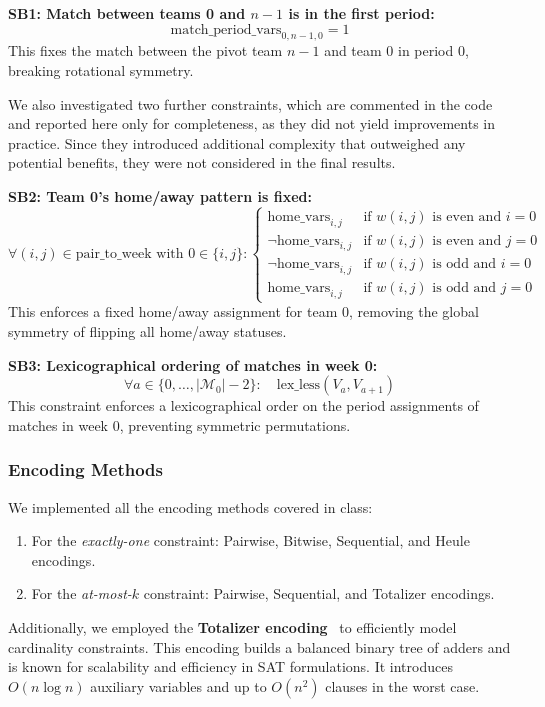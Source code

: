 \textbf{SB1: Match between teams 0 and $n-1$ is in the first period:}
\[
\text{match\_period\_vars}_{0,n-1,0} = 1
\]
This fixes the match between the pivot team $n-1$ and team 0 in period 0, breaking rotational symmetry.

We also investigated two further constraints, which are commented in the code and reported here only for completeness, as they did not yield improvements in practice. Since they introduced additional complexity that outweighed any potential benefits, they were not considered in the final results.

\textbf{SB2: Team 0's home/away pattern is fixed:}
\[
\forall (i,j) \in \text{pair\_to\_week} \text{ with } 0 \in \{i,j\}:
\begin{cases}
\text{home\_vars}_{i,j} & \text{if } w(i,j) \text{ is even and } i=0 \\
\neg \text{home\_vars}_{i,j} & \text{if } w(i,j) \text{ is even and } j=0 \\
\neg \text{home\_vars}_{i,j} & \text{if } w(i,j) \text{ is odd and } i=0 \\
\text{home\_vars}_{i,j} & \text{if } w(i,j) \text{ is odd and } j=0
\end{cases}
\]
This enforces a fixed home/away assignment for team 0, removing the global symmetry of flipping all home/away statuses.

\textbf{SB3: Lexicographical ordering of matches in week 0:}
\[
\forall a \in \{0, \dots, |\mathcal{M}_0| - 2\}: \quad \text{lex\_less}(V_a, V_{a+1})
\]
This constraint enforces a lexicographical order on the period assignments of matches in week 0, preventing symmetric permutations.


\subsubsection*{Encoding Methods}
We implemented all the encoding methods covered in class:

\begin{enumerate}
    \item For the \textit{exactly-one} constraint: Pairwise, Bitwise, Sequential, and Heule encodings.
    \item For the \textit{at-most-$k$} constraint: Pairwise, Sequential, and Totalizer encodings.
\end{enumerate}

Additionally, we employed the \textbf{Totalizer encoding}~\cite{bailleux2003} to efficiently model cardinality constraints. This encoding builds a balanced binary tree of adders and is known for scalability and efficiency in SAT formulations. It introduces $O(n \log n)$ auxiliary variables and up to $O(n^2)$ clauses in the worst case.

